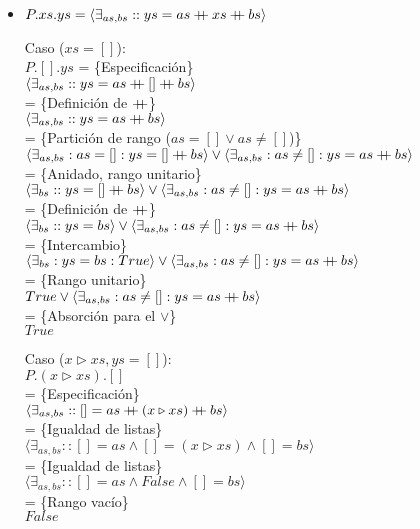 \documentclass[12pt]{article}
\newcommand{\concat}{%
  \mathbin{{+}\mspace{-8mu}{+}}%
}
\begin{document}
\begin{itemize}
    \item $ P.xs.ys = \langle \exists_{as,bs} :: ys = as \concat xs \concat bs \rangle $

    \bigbreak

    Caso ($xs = []$):\\
    $ P.[].ys $
    = \{Especificación\}\\
    $ \langle \exists_{as,bs} :: ys = as \concat [] \concat bs \rangle $\\
    = \{Definición de$~\concat$\}\\
    $ \langle \exists_{as,bs} :: ys = as \concat bs \rangle $\\
    = \{Partición de rango ($as = [] \lor as \neq []$)\}\\
    $ \langle \exists_{as,bs} : as = [] : ys = [] \concat bs \rangle \lor \langle \exists_{as,bs} : as \neq [] : ys = as \concat bs \rangle $\\
    = \{Anidado, rango unitario\}\\
    $ \langle \exists_{bs} :: ys = [] \concat bs \rangle \lor \langle \exists_{as,bs} : as \neq [] : ys = as \concat bs \rangle $\\
    = \{Definición de$~\concat$\}\\
    $ \langle \exists_{bs} :: ys = bs \rangle \lor \langle \exists_{as,bs} : as \neq [] : ys = as \concat bs \rangle $\\
    = \{Intercambio\}\\
    $ \langle \exists_{bs} : ys = bs : True \rangle \lor \langle \exists_{as,bs} : as \neq [] : ys = as \concat bs \rangle $\\
    = \{Rango unitario\}\\
    $ True \lor \langle \exists_{as,bs} : as \neq [] : ys = as \concat bs \rangle $\\
    = \{Absorción  para el $\lor$\}\\
    $ True $

    \bigbreak

    Caso ($x \triangleright xs, ys = []$):\\
    $ P.(x \triangleright xs).[] $\\
    = \{Especificación\}\\
    $ \langle \exists_{as,bs} :: [] = as \concat (x \triangleright xs) \concat bs \rangle $\\
    = \{Igualdad de listas\}\\
    $ \langle \exists_{as,bs} :: [] = as \land [] = (x \triangleright xs) \land [] = bs \rangle $\\
    = \{Igualdad de listas\}\\
    $ \langle \exists_{as,bs} :: [] = as \land False \land [] = bs \rangle $\\
    = \{Rango vacío\}\\
    $ False $\\


\end{itemize}
\end{document}
